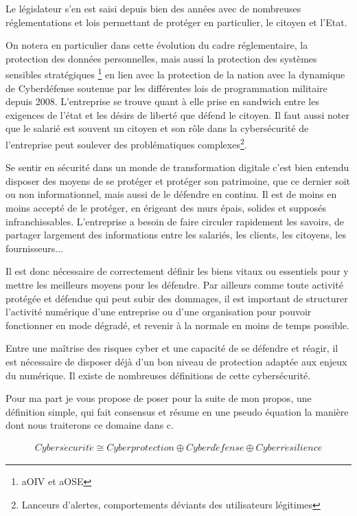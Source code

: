 Le législateur s'en est saisi depuis bien des années avec de nombreuses réglementations et lois permettant de protéger en particulier, le citoyen et l'Etat.

On notera en particulier dans cette évolution du cadre réglementaire,  la protection des données personnelles, mais aussi la protection des systèmes sensibles stratégiques \footnote{\gls{aOIV}  et \gls{aOSE} } en lien avec la protection de la nation avec la dynamique de Cyberdéfense soutenue par les différentes lois de programmation militaire depuis 2008. L'entreprise se trouve quant à elle prise en sandwich entre les exigences de l'état et les désirs de liberté que défend le citoyen. Il faut aussi noter que le salarié est souvent un citoyen et son rôle dans la cybersécurité de l'entreprise peut soulever des problématiques complexes\footnote{Lanceurs d'alertes, comportements déviants des utilisateurs légitimes}.
 
Se sentir en sécurité dans un monde de transformation digitale c'est bien entendu disposer des moyens de se protéger et protéger son patrimoine, que ce dernier soit ou non informationnel, mais aussi de le défendre en continu. Il est de moins en moins accepté de le protéger, en érigeant des murs épais, solides et supposés infranchissables. L'entreprise a besoin de faire circuler rapidement les savoirs, de partager largement des informations entre les salariés, les clients, les citoyens, les fournisseurs...


Il est donc nécessaire de correctement définir les biens vitaux ou essentiels pour y mettre les meilleurs moyens pour les défendre. Par ailleurs comme toute activité protégée et défendue qui peut subir des dommages, il est important de structurer l'activité numérique d'une entreprise ou d'une organisation pour pouvoir fonctionner en mode dégradé, et revenir à la normale en moins de temps possible.


Entre une maîtrise des risques cyber et une capacité de se défendre et réagir, il est nécessaire de disposer déjà d'un bon niveau de protection adaptée aux enjeux du numérique. Il existe de nombreuses définitions de cette cybersécurité.

Pour ma part je vous propose de poser pour la suite de mon propos, une définition simple, qui fait consensus et résume en une pseudo équation la manière dont nous traiterons ce domaine dans c\ecours. \\
\begin{nota}
\begin{align}
Cybers\acute{e}curit\acute{e} \cong Cyberprotection\oplus Cyberd\acute{e}fense \oplus Cyberr\acute{e}silience
\end{align}
\end{nota}


